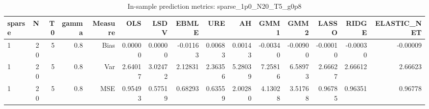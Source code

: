 \begin{table}[!htbp]\centering
\caption{In-sample prediction metrics: sparse_1p0_N20_T5_g0p8}
\label{tab:table2_sparse_1p0_N20_T5_g0p8}
\begin{tabular}{lrrrrrrrrrrrrrr}
\hline
sparse & N & T0 & gamma & Measure & OLS & LSDV & EBMLE & URE & AH & GMM1 & GMM2 & LASSO & RIDGE & ELASTIC_NET \\
\hline
1 & 20 & 5 & 0.8 & Bias & 0.00000 & 0.00000 & -0.01163 & 0.00683 & 0.00143 & -0.00340 & -0.00900 & -0.00010 & -0.00030 & -0.00009 \\
1 & 20 & 5 & 0.8 & Var & 2.64017 & 3.02472 & 2.12831 & 2.36356 & 5.28039 & 7.25816 & 6.58973 & 2.66627 & 2.66612 & 2.66623 \\
1 & 20 & 5 & 0.8 & MSE & 0.95493 & 0.57519 & 0.68293 & 0.63559 & 2.00280 & 4.13028 & 3.51768 & 0.96785 & 0.96351 & 0.96778 \\
\hline
\end{tabular}
\end{table}

